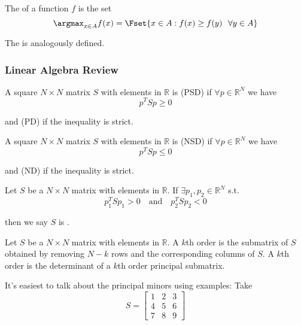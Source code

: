 \documentclass{article}
\begin{document}
\begin{definition}
  The \keyword{$\argmax$} of a function $f$ is the set
  \[
    \argmax_{x \in A} f(x) = \Fset{x \in A: f(x) \ge f(y) ~~ \forall y \in A}
  \]

  The \keyword{$\argmin$} is analogously defined.
\end{definition}

\subsubsection{Linear Algebra Review}
\label{ssub:linear_algebra_review}

\begin{definition}
  A square $N \times N$ matrix $S$ with elements in $\mathbb{R}$ is  (PSD) if $\forall p \in \mathbb{R}^N$ we have
  \[
    p^T S p \ge 0
  \]

  and  (PD) if the inequality is strict.
\end{definition}

\begin{definition}
  A square $N \times N$ matrix $S$ with elements in $\mathbb{R}$ is  (NSD) if $\forall p \in \mathbb{R}^N$ we have
  \[
    p^T S p \le 0
  \]

  and  (ND) if the inequality is strict.
\end{definition}

\begin{definition}
  Let $S$ be a $N \times N$ matrix with elements in $\mathbb{R}$. If $\exists p_1, p_2 \in \mathbb{R}^N$ s.t.
  \[
    p_1^T S p_1 > 0
    \quad
    \text{and}
    \quad
    p_2^T S p_2 < 0
  \]

  then we say $S$ is .
\end{definition}

\begin{definition}
  Let $S$ be a $N \times N$ matrix with elements in $\mathbb{R}$. A $k$th order  is the submatrix of $S$ obtained by removing $N - k$ rows and the corresponding columns of $S$. A $k$th order  is the determinant of a $k$th order principal submatrix.
\end{definition}

It's easiest to talk about the principal minors using examples: Take
\[
  S = \left[\begin{matrix}
    1 & 2 & 3 \\
    4 & 5 & 6 \\
    7 & 8 & 9
  \end{matrix}\right]
\]
\end{document}

